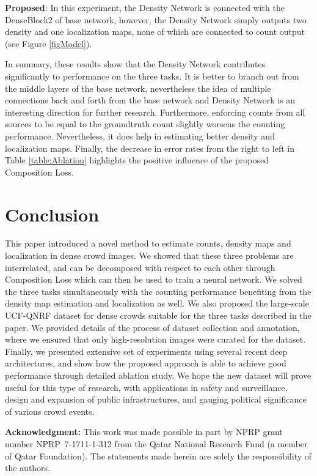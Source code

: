 \documentclass[runningheads]{llncs}
\begin{document}
\smallskip

\noindent\textbf{Proposed}: In this experiment, the Density Network is connected with the DenseBlock2 of base network, however, the Density Network simply outputs two density and one localization maps, none of which are connected to count output (see Figure \ref{figModel}).

\smallskip

In summary, these results show that the Density Network contributes significantly to performance on the three tasks. It is better to branch out from the middle layers of the base network, nevertheless the idea of multiple connections back and forth from the base network and Density Network is an interesting direction for further research. Furthermore, enforcing counts from all sources to be equal to the groundtruth count slightly worsens the counting performance. Nevertheless, it does help in estimating better density and localization maps. Finally, the decrease in error rates from the right to left in Table \ref{table:Ablation} highlights the positive influence of the proposed Composition Loss.


\section{Conclusion}\label{secConclusion}
This paper introduced a novel method to estimate counts, density maps and localization in dense crowd images. We showed that these three problems are interrelated, and can be decomposed with respect to each other through Composition Loss which can then be used to train a neural network. We solved the three tasks simultaneously with the counting performance benefiting from the density map estimation and localization as well. We also proposed the large-scale UCF-QNRF dataset for dense crowds suitable for the three tasks described in the paper. We provided details of the process of dataset collection and annotation, where we ensured that only high-resolution images were curated for the dataset. Finally, we presented extensive set of experiments using several recent deep architectures, and show how the proposed approach is able to achieve good performance through detailed ablation study. We hope the new dataset will prove useful for this type of research, with applications in safety and surveillance, design and expansion of public infrastructures, and gauging political significance of various crowd events.

\smallskip
\noindent\textbf{Acknowledgment:} This work was made possible in part by NPRP grant number NPRP~7-1711-1-312 from the Qatar National Research Fund (a member of Qatar Foundation). The statements made herein are solely the responsibility of the authors.



\end{document}
